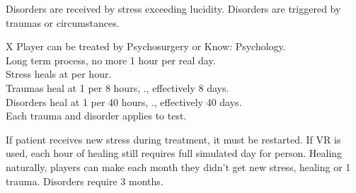 \begin{itemize}
    \itembox Disorders are received by stress exceeding lucidity.
    \itembox Disorders are triggered by traumas or circumstances.
\end{itemize}

\bigskip

\begin{eptable}{ X }
   Player can be treated by Psychosurgery or Know: Psychology.\\
   Long term process, no more 1 hour per real day.\\
   Stress heals at  per hour.\\
   Traumas heal at \num{1} per \num{8} hours, \ie., effectively \num{8} days.\\
   Disorders heal at \num{1} per \num{40} hours, \ie., effectively \num{40} days.\\
   Each trauma and disorder applies  to test.\\
\end{eptable}

\begin{itemize}
    \itembox If patient receives new stress during treatment, it must be restarted.
    \itembox If VR is used, each hour of healing still requires full simulated day for person.
    \itembox Healing naturally, players can make  each month they didn't get new
            stress, healing  or \num{1} trauma. Disorders require \num{3} months.
\end{itemize}

\bigskip

